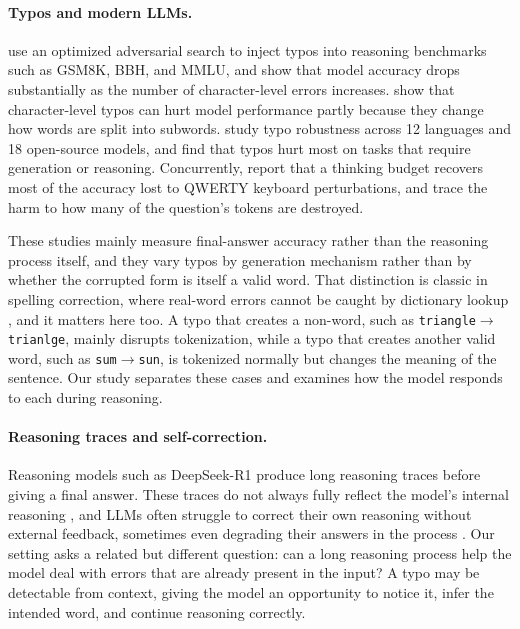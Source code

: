 \documentclass[11pt]{article}
\newcommand{\arrow}{$\rightarrow$}
\begin{document}
\paragraph{Typos and modern LLMs.}
\citet{gan2024} use an optimized adversarial search to inject typos into
reasoning benchmarks such as GSM8K, BBH, and MMLU, and show that model accuracy
drops substantially as the number of character-level errors increases.
\citet{chai2024} show that character-level typos can hurt model performance
partly because they change how words are split into subwords.
\citet{zhao2026} study typo robustness across 12 languages and 18 open-source
models, and find that typos hurt most on tasks that require generation or
reasoning. Concurrently, \citet{hu2026hive} report that a thinking budget
recovers most of the accuracy lost to QWERTY keyboard perturbations, and trace
the harm to how many of the question's tokens are destroyed.

These studies mainly measure final-answer accuracy rather than the reasoning
process itself, and they vary typos by generation mechanism rather than by
whether the corrupted form is itself a valid word. That distinction is classic
in spelling correction, where real-word errors cannot be caught by dictionary
lookup \citep{kukich1992,hirst2005}, and it matters here too. A typo that
creates a non-word, such as \texttt{triangle\arrow trianlge}, mainly disrupts
tokenization, while a typo that creates another valid word, such as
\texttt{sum\arrow sun}, is tokenized normally but changes the meaning of the
sentence. Our study separates these cases and examines how the model responds
to each during reasoning.

\paragraph{Reasoning traces and self-correction.}
Reasoning models such as DeepSeek-R1 \citep{deepseekr1} produce long reasoning
traces before giving a final answer. These traces do not always fully reflect
the model's internal reasoning \citep{turpin2023}, and LLMs often struggle to
correct their own reasoning without external feedback, sometimes even degrading
their answers in the process \citep{huang2024}. Our setting asks a related but
different question: can a long reasoning process help the model deal with errors
that are already present in the input? A typo may be detectable from context,
giving the model an opportunity to notice it, infer the intended word, and
continue reasoning correctly.
\end{document}

